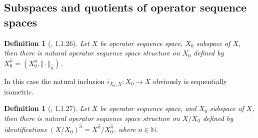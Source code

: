 \documentclass[12pt]{article}
\newtheorem{definition}[theorem]{Definition}
\begin{document}
\subsection{Subspaces and quotients of operator sequence spaces}

\begin{definition}[\cite{LamOpFolgen}, 1.1.26]\label{DefSQSubSpace}
Let $X$ be operator sequence space, $X_0$ subspace of $X$, then there is natural 
operator sequence space structure on $X_0$ defined by 
$X_0^{\wideparen{n}}=(X_0^n,\Vert\cdot\Vert_{\wideparen{n}})$.
\end{definition}

In this case the natural inclusion $i_{X_0,X}:X_0\to X$ obviously is 
sequentially isometric.

\begin{definition}[\cite{LamOpFolgen}, 1.1.27]\label{DefSQFactorSpace}
Let $X$ be operator sequence space, and $X_0$ subspace of $X$, then there is 
natural operator sequence space structure on $X / X_0$ defined by 
identifications 
${(X / X_0)}^{\wideparen{n}} = X^{\wideparen{n}} / X_0^{\wideparen{n}}$, 
where $n\in\mathbb{N}$. 
\end{definition}
\end{document}
